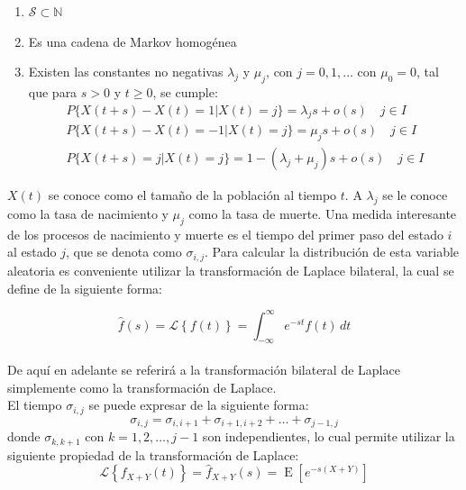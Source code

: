 \documentclass[11pt]{article}
\numberwithin{equation}{section} %
\begin{document}
\begin{enumerate}
  \item $\mathcal{S} \subset \mathbb{N}$
  \item Es una cadena de Markov homogénea
  \item Existen las constantes no negativas $\lambda_j$ y $\mu_j$, con $j=0,1,\ldots$ con $\mu_0=0$, tal que para $s>0$ y $t\geq 0$, se cumple:
\begin{subequations}
\begin{eqnarray}
P\{X(t+s)-X(t)=1|X(t)=j\} = \lambda_j s + o(s)\quad j \in I \\
P\{X(t+s)-X(t)=-1|X(t)=j\} = \mu_js + o(s)\quad j \in I \\
P\{X(t+s)=j|X(t)=j\} = 1-(\lambda_j+\mu_j)s + o(s)\quad j \in I 
\end{eqnarray}
\end{subequations}
\end{enumerate}


$X(t)$ se conoce como el tamaño de la población al tiempo $t$. A $\lambda_j$ se le conoce como la tasa de nacimiento y $\mu_j$ como la tasa de muerte. Una medida interesante de los procesos de nacimiento y muerte es el tiempo del primer paso del estado $i$ al estado $j$, que se denota como $\sigma_{i,j}$. Para calcular la distribución de esta variable aleatoria es conveniente utilizar la transformación de Laplace bilateral, la cual se define de la siguiente forma:

\begin{equation}
\hat{f}(s) = \mathcal{L} \left\{f(t)\right\}=\int_{-\infty}^{\infty} e^{-st} f(t) \,dt
\end{equation}\\

De aquí en adelante se referirá a la transformación bilateral de Laplace simplemente como la transformación de Laplace.\\

El tiempo $\sigma_{i,j}$ se puede expresar de la siguiente forma:
\begin{equation}
\sigma_{i,j}=\sigma_{i,i+1}+\sigma_{i+1,i+2}+\ldots+\sigma_{j-1,j}
\end{equation}
donde $\sigma_{k,k+1}$ con $k=1,2,\ldots,j-1$ son independientes, lo cual permite utilizar la siguiente propiedad de la transformación de Laplace:
\begin{equation}
\mathcal{L} \left\{f_{X+Y}(t)\right\}=\hat{f}_{X+Y}(s)=\operatorname{E}[e^{-s(X+Y)}]
\end{equation}
\end{document}
